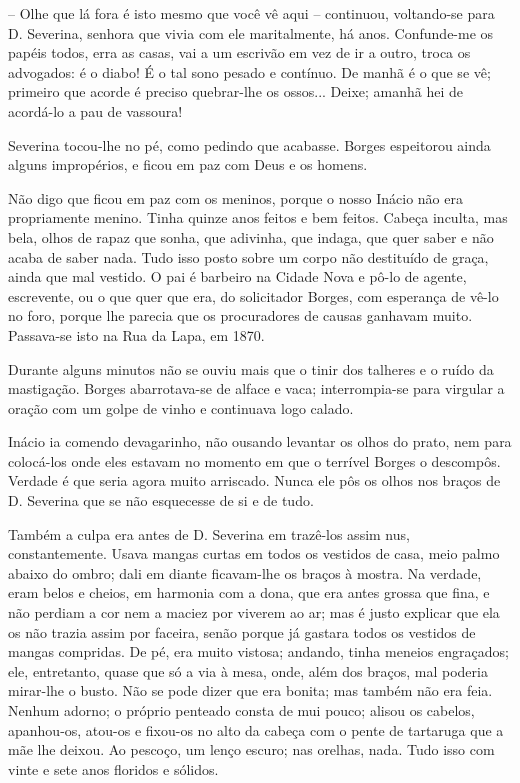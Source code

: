 -- Olhe que lá fora é isto mesmo que você vê aqui -- continuou,
voltando-se para D. Severina, senhora que vivia com ele maritalmente, há
anos. Confunde-me os papéis todos, erra as casas, vai a um escrivão em
vez de ir a outro, troca os advogados: é o diabo! É o tal sono pesado e
contínuo. De manhã é o que se vê; primeiro que acorde é preciso
quebrar-lhe os ossos... Deixe; amanhã hei de acordá-lo a pau de
vassoura!

Severina tocou-lhe no pé, como pedindo que acabasse. Borges espeitorou
ainda alguns impropérios, e ficou em paz com Deus e os homens.

Não digo que ficou em paz com os meninos, porque o nosso Inácio não era
propriamente menino. Tinha quinze anos feitos e bem feitos. Cabeça
inculta, mas bela, olhos de rapaz que sonha, que adivinha, que indaga,
que quer saber e não acaba de saber nada. Tudo isso posto sobre um corpo
não destituído de graça, ainda que mal vestido. O pai é barbeiro na
Cidade Nova e pô-lo de agente, escrevente, ou o que quer que era, do
solicitador Borges, com esperança de vê-lo no foro, porque lhe parecia
que os procuradores de causas ganhavam muito. Passava-se isto na Rua da
Lapa, em 1870.

Durante alguns minutos não se ouviu mais que o tinir dos talheres e o
ruído da mastigação. Borges abarrotava-se de alface e vaca;
interrompia-se para virgular a oração com um golpe de vinho e continuava
logo calado.

Inácio ia comendo devagarinho, não ousando levantar os olhos do prato,
nem para colocá-los onde eles estavam no momento em que o terrível
Borges o descompôs. Verdade é que seria agora muito arriscado. Nunca ele
pôs os olhos nos braços de D. Severina que se não esquecesse de si e de
tudo.

Também a culpa era antes de D. Severina em trazê-los assim nus,
constantemente. Usava mangas curtas em todos os vestidos de casa, meio
palmo abaixo do ombro; dali em diante ficavam-lhe os braços à mostra. Na
verdade, eram belos e cheios, em harmonia com a dona, que era antes
grossa que fina, e não perdiam a cor nem a maciez por viverem ao ar; mas
é justo explicar que ela os não trazia assim por faceira, senão porque
já gastara todos os vestidos de mangas compridas. De pé, era muito
vistosa; andando, tinha meneios engraçados; ele, entretanto, quase que
só a via à mesa, onde, além dos braços, mal poderia mirar-lhe o busto.
Não se pode dizer que era bonita; mas também não era feia. Nenhum
adorno; o próprio penteado consta de mui pouco; alisou os cabelos,
apanhou-os, atou-os e fixou-os no alto da cabeça com o pente de
tartaruga que a mãe lhe deixou. Ao pescoço, um lenço escuro; nas
orelhas, nada. Tudo isso com vinte e sete anos floridos e sólidos.

